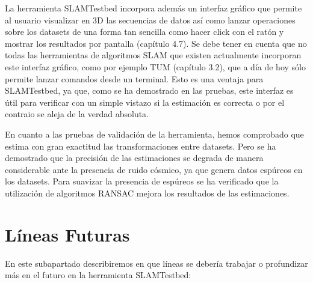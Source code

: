 La herramienta SLAMTestbed incorpora además un interfaz gráfico que permite al usuario visualizar en 3D las secuencias de datos así como lanzar operaciones sobre los datasets de una forma tan sencilla como hacer click con el ratón y mostrar los resultados por pantalla (capítulo 4.7). Se debe tener en cuenta que no todas las herramientas de algoritmos SLAM que existen actualmente incorporan este interfaz gráfico, como por ejemplo TUM (capítulo 3.2), que a día de hoy sólo permite lanzar comandos desde un terminal. Esto es una ventaja para SLAMTestbed, ya que, como se ha demostrado en las pruebas, este interfaz es útil para verificar con un simple vistazo si la estimación es correcta o por el contraio se aleja de la verdad absoluta.

En cuanto a las pruebas de validación de la herramienta, hemos comprobado que estima con gran exactitud las transformaciones entre datasets. Pero se ha demostrado que la precisión de las estimaciones se degrada de manera considerable ante la presencia de ruido cósmico, ya que genera datos espúreos en los datasets. Para suavizar la presencia de espúreos se ha verificado que la utilización de algoritmos RANSAC mejora los resultados de las estimaciones.


\section{Líneas Futuras}

En este subapartado describiremos en que líneas se debería trabajar o profundizar más en el futuro en la herramienta SLAMTestbed:

